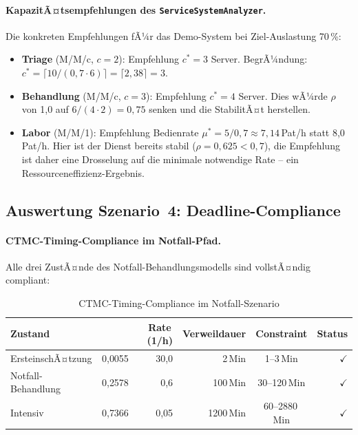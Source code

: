 ﻿\documentclass[a4paper,12pt]{report}
\theoremstyle{definition}
\begin{document}
\paragraph{KapazitÃ¤tsempfehlungen des \texttt{ServiceSystemAnalyzer}.}
Die konkreten Empfehlungen fÃ¼r das Demo-System bei Ziel-Auslastung 70\,\%:
\begin{itemize}
	\item[-] \textbf{Triage} (M/M/c, $c=2$): Empfehlung $c^* = 3$ Server.
	BegrÃ¼ndung: $c^* = \lceil 10/(0{,}7 \cdot 6) \rceil = \lceil 2{,}38 \rceil = 3$.
	\item[-] \textbf{Behandlung} (M/M/c, $c=3$): Empfehlung $c^* = 4$ Server.
	Dies wÃ¼rde $\rho$ von 1{,}0 auf $6/(4 \cdot 2) = 0{,}75$ senken und
	die StabilitÃ¤t herstellen.
	\item[-] \textbf{Labor} (M/M/1): Empfehlung Bedienrate
	$\mu^* = 5/0{,}7 \approx 7{,}14$\,Pat/h statt 8{,}0\,Pat/h.
	Hier ist der Dienst bereits stabil ($\rho = 0{,}625 < 0{,}7$),
	die Empfehlung ist daher eine Drosselung auf die minimale
	notwendige Rate -- ein Ressourceneffizienz-Ergebnis.
\end{itemize}

\subsection{Auswertung Szenario~4: Deadline-Compliance}

\paragraph{CTMC-Timing-Compliance im Notfall-Pfad.}
Alle drei ZustÃ¤nde des Notfall-Behand\-lungsmodells sind vollstÃ¤ndig compliant:

\begin{table}[H]
	\centering
	\begin{tabular}{@{}lrrrcr@{}}
		\toprule
		\textbf{Zustand} & \boldmath{$\pi_i$} & \textbf{Rate}\,(1/h) &
		\textbf{Verweildauer} & \textbf{Constraint} & \textbf{Status} \\
		\midrule
		ErsteinschÃ¤tzung  & 0{,}0055 & 30{,}0 &  2\,Min & 1--3\,Min   & $\checkmark$ \\
		Notfall-Behandlung& 0{,}2578 &  0{,}6 & 100\,Min& 30--120\,Min& $\checkmark$ \\
		Intensiv          & 0{,}7366 & 0{,}05 &1200\,Min& 60--2880\,Min&$\checkmark$ \\
		\bottomrule
	\end{tabular}
	\caption{CTMC-Timing-Compliance im Notfall-Szenario}
	\label{tab:ctmc-compliance-auswertung}
\end{table}
\end{document}
